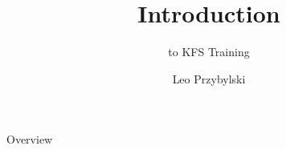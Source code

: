 \documentclass[xcolor=dvipsnames,14pt]{beamer}
\begin{document}
\title{Introduction}
\subtitle{to KFS Training}
\author[Leo]{Leo Przybylski}

\begin{frame}[plain]
  \titlepage
\end{frame}

\begin{frame}{Overview}
\end{frame}
\end{document}
